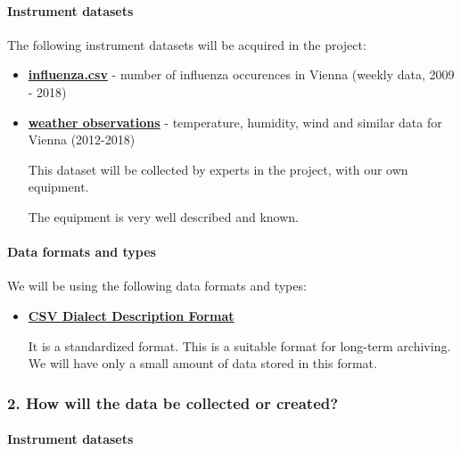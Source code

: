 \documentclass[
]{article}
\begin{document}
\hypertarget{instrument-datasets}{%
\paragraph{Instrument datasets}\label{instrument-datasets}}

The following instrument datasets will be acquired in the project:

\begin{itemize}
\item \textbf{\href{https://www.data.gv.at/katalog/dataset/grippemeldedienst-stadt-wien}{influenza.csv}} - number of influenza occurences in Vienna (weekly data, 2009 - 2018)
  \item \textbf{\href{https://www.meteoblue.com/en/weather/archive/export/vienna_austria_2761369}{weather observations}} - temperature, humidity, wind and similar data for Vienna (2012-2018)


  This dataset will be collected by experts in the project, with our own
  equipment.

  The equipment is very well described and known.
\end{itemize}

\hypertarget{data-formats-and-types}{%
\paragraph{Data formats and types}\label{data-formats-and-types}}

We will be using the following data formats and types:

\begin{itemize}
\item
  \textbf{\href{https://fairsharing.org/bsg-s001303}{CSV Dialect
  Description Format}}

  It is a standardized format. This is a suitable format for long-term
  archiving. We will have only a small amount of data stored in this
  format.
\end{itemize}

\hypertarget{q-how-data}{}
\hypertarget{how-will-the-data-be-collected-or-created}{%
\subsubsection{2. How will the data be collected or
created?}\label{how-will-the-data-be-collected-or-created}}

\hypertarget{instrument-datasets-1}{%
\paragraph{Instrument datasets}\label{instrument-datasets-1}}
\end{document}
